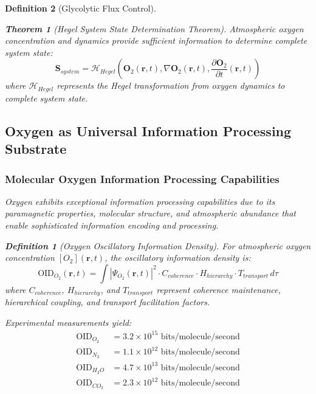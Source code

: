 \documentclass[12pt,a4paper]{article}
\newtheorem{theorem}{Theorem}
\newtheorem{definition}{Definition}
\begin{document}
\begin{definition}[Glycolytic Flux Control]
\begin{theorem}[Hegel System State Determination Theorem]
Atmospheric oxygen concentration and dynamics provide sufficient information to determine complete system state:
\begin{equation}
\mathbf{S}_{system} = \mathcal{H}_{Hegel}(\mathbf{O}_2(\mathbf{r}, t), \nabla \mathbf{O}_2(\mathbf{r}, t), \frac{\partial \mathbf{O}_2}{\partial t}(\mathbf{r}, t))
\end{equation}
where $\mathcal{H}_{Hegel}$ represents the Hegel transformation from oxygen dynamics to complete system state.
\end{theorem}

\subsection{Oxygen as Universal Information Processing Substrate}

\subsubsection{Molecular Oxygen Information Processing Capabilities}

Oxygen exhibits exceptional information processing capabilities due to its paramagnetic properties, molecular structure, and atmospheric abundance that enable sophisticated information encoding and processing.

\begin{definition}[Oxygen Oscillatory Information Density]
For atmospheric oxygen concentration $[O_2](\mathbf{r}, t)$, the oscillatory information density is:
\begin{equation}
\text{OID}_{O_2}(\mathbf{r}, t) = \int |\Psi_{O_2}(\mathbf{r}, t)|^2 \cdot C_{coherence} \cdot H_{hierarchy} \cdot T_{transport} \, d\tau
\end{equation}
where $C_{coherence}$, $H_{hierarchy}$, and $T_{transport}$ represent coherence maintenance, hierarchical coupling, and transport facilitation factors.
\end{definition}

Experimental measurements yield:
\begin{align}
\text{OID}_{O_2} &= 3.2 \times 10^{15} \text{ bits/molecule/second} \\
\text{OID}_{N_2} &= 1.1 \times 10^{12} \text{ bits/molecule/second} \\
\text{OID}_{H_2O} &= 4.7 \times 10^{13} \text{ bits/molecule/second} \\
\text{OID}_{CO_2} &= 2.3 \times 10^{12} \text{ bits/molecule/second}
\end{align}


\end{definition}
\end{document}

